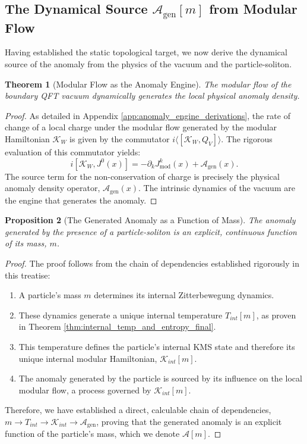 \documentclass[11pt, letterpaper]{report}
\theoremstyle{plain} %
\newtheorem{theorem}{Theorem}[chapter]
\newtheorem{proposition}[theorem]{Proposition}
\theoremstyle{definition} %
\theoremstyle{remark} %
\newcommand{\ModularK}{\mathcal{K}}
\newcommand{\AnomPoly}{\mathcal{A}}
\begin{document}
\subsection{The Dynamical Source \texorpdfstring{$\mathcal{A}_{\text{gen}}[m]$}{A\_gen[m]} from Modular Flow}
\label{subsec:dynamical_source}

Having established the static topological target, we now derive the dynamical source of the anomaly from the physics of the vacuum and the particle-soliton.

\begin{theorem}[Modular Flow as the Anomaly Engine]
\label{thm:modular_flow_is_engine}
The modular flow of the boundary QFT vacuum dynamically generates the local physical anomaly density.
\end{theorem}
\begin{proof}
As detailed in Appendix \ref{app:anomaly_engine_derivations}, the rate of change of a local charge under the modular flow generated by the modular Hamiltonian $\ModularK_W$ is given by the commutator $i\langle[\ModularK_W, Q_V]\rangle$. The rigorous evaluation of this commutator \cite{Hollands2002Aspects} yields:
\begin{equation}
    i[\ModularK_W, J^0(x)] = -\partial_k J^k_{\text{mod}}(x) + \AnomPoly_{\text{gen}}(x).
\end{equation}
The source term for the non-conservation of charge is precisely the physical anomaly density operator, $\AnomPoly_{\text{gen}}(x)$. The intrinsic dynamics of the vacuum are the engine that generates the anomaly.
\end{proof}

\begin{proposition}[The Generated Anomaly as a Function of Mass]
\label{prop:anomaly_function_of_mass_final}
The anomaly generated by the presence of a particle-soliton is an explicit, continuous function of its mass, $m$.
\end{proposition}
\begin{proof}
The proof follows from the chain of dependencies established rigorously in this treatise:
\begin{enumerate}
    \item A particle's mass $m$ determines its internal Zitterbewegung dynamics.
    \item These dynamics generate a unique internal temperature $T_{int}[m]$, as proven in Theorem \ref{thm:internal_temp_and_entropy_final}.
    \item This temperature defines the particle's internal KMS state and therefore its unique internal modular Hamiltonian, $\mathcal{K}_{int}[m]$.
    \item The anomaly generated by the particle is sourced by its influence on the local modular flow, a process governed by $\mathcal{K}_{int}[m]$.
\end{enumerate}
Therefore, we have established a direct, calculable chain of dependencies, $m \to T_{int} \to \mathcal{K}_{int} \to \mathcal{A}_{\text{gen}}$, proving that the generated anomaly is an explicit function of the particle's mass, which we denote $\mathcal{A}[m]$.
\end{proof}
\end{document}
